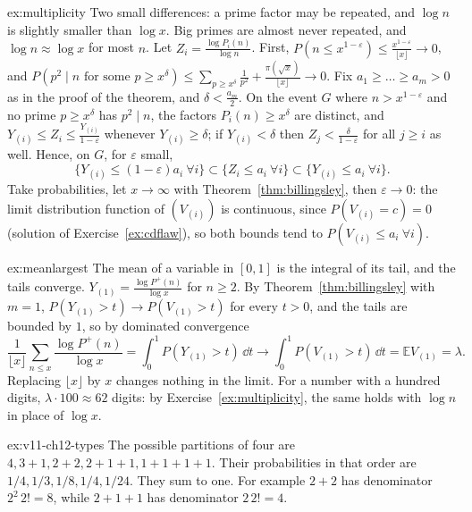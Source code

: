 \begin{solution}{ex:multiplicity}
\idea Two small differences: a prime factor may be repeated, and $\log n$ is slightly smaller than $\log x$. Big primes are almost never repeated, and $\log n\approx\log x$ for most $n$.
\writeup Let $Z_i=\frac{\log P_i(n)}{\log n}$. First, $P(n\le x^{1-\varepsilon})\le\frac{x^{1-\varepsilon}}{\lfloor x\rfloor}\to0$, and $P(p^2\mid n\text{ for some }p\ge x^\delta)\le\sum_{p\ge x^\delta}\frac1{p^2}+\frac{\pi(\sqrt x)}{\lfloor x\rfloor}\to0$. Fix $a_1\ge\dots\ge a_m>0$ as in the proof of the theorem, and $\delta<\frac{a_m}2$. On the
event $G$ where $n>x^{1-\varepsilon}$ and no prime $p\ge x^\delta$ has $p^2\mid n$, the factors $P_i(n)\ge x^\delta$ are distinct, and $Y_{(i)}\le Z_i\le\frac{Y_{(i)}}{1-\varepsilon}$ whenever $Y_{(i)}\ge\delta$; if $Y_{(i)}<\delta$ then $Z_j<\frac\delta{1-\varepsilon}$ for all $j\ge i$ as well. Hence, on $G$, for $\varepsilon$ small,
\[
\{Y_{(i)}\le(1-\varepsilon)a_i\ \forall i\}\subset\{Z_i\le a_i\ \forall i\}\subset\{Y_{(i)}\le a_i\ \forall i\}.
\]
Take probabilities, let $x\to\infty$ with Theorem~\ref{thm:billingsley}, then $\varepsilon\to0$: the limit distribution function of $(V_{(i)})$ is continuous, since $P(V_{(i)}=c)=0$ (solution of Exercise~\ref{ex:cdflaw}), so both bounds tend to $P(V_{(i)}\le a_i\ \forall i)$.
\end{solution}

\begin{solution}{ex:meanlargest}
\idea The mean of a variable in $[0,1]$ is the integral of its tail, and the tails converge.
\writeup $Y_{(1)}=\frac{\log P^+(n)}{\log x}$ for $n\ge2$. By Theorem~\ref{thm:billingsley} with $m=1$, $P(Y_{(1)}>t)\to P(V_{(1)}>t)$ for every $t>0$, and the tails are bounded by $1$, so by dominated convergence
\[
\frac1{\lfloor x\rfloor}\sum_{n\le x}\frac{\log P^+(n)}{\log x}=\int_0^1P(Y_{(1)}>t)\,\dd t\longrightarrow\int_0^1P(V_{(1)}>t)\,\dd t=\mathbb EV_{(1)}=\lambda.
\]
Replacing $\lfloor x\rfloor$ by $x$ changes nothing in the limit. For a number with a hundred digits, $\lambda\cdot100\approx62$ digits: by Exercise~\ref{ex:multiplicity}, the same holds with $\log n$ in place of $\log x$.
\end{solution}

\begin{solution}{ex:v11-ch12-types}
\idea The possible partitions of four are $4,3+1,2+2,2+1+1,1+1+1+1$.
\writeup Their probabilities in that order are $1/4,1/3,1/8,1/4,1/24$. They sum to one. For example $2+2$ has denominator $2^2\,2!=8$, while $2+1+1$ has denominator $2\,2!=4$.
\end{solution}

